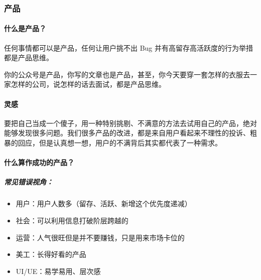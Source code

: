 \documentclass[letterpaper,11pt,english]{sphinxmanual}
\begin{document}
\subsubsection{产品}
\label{\detokenize{chapter_introduction/Product:id1}}\label{\detokenize{chapter_introduction/Product::doc}}

\paragraph{什么是产品？}
\label{\detokenize{chapter_introduction/Product:id2}}
任何事情都可以是产品，任何让用户挑不出 Bug
并有高留存高活跃度的行为举措都是产品思维。

你的公众号是产品，你写的文章也是产品，甚至，你今天要穿一套怎样的衣服去一家怎样的公司，说怎样的话去面试，都是产品思维。


\paragraph{灵感}
\label{\detokenize{chapter_introduction/Product:id3}}
要把自己当成一个傻子，用一种特别挑剔、不满意的方法去试用自己的产品，绝对能够发现很多问题。我们很多产品的改进，都是来自用户看起来不理性的投诉、粗暴的回应，但是认真想一想，用户的不满背后其实都代表了一种需求。
%
\begin{footnote}[16]\sphinxAtStartFootnote
{}
%
\end{footnote}


\paragraph{什么算作成功的产品？}
\label{\detokenize{chapter_introduction/Product:id4}}

\subparagraph{常见错误视角：}
\label{\detokenize{chapter_introduction/Product:id5}}\begin{itemize}
\item {} 
用户：用户人数多（留存、活跃、新增这个优先度递减）

\item {} 
社会：可以利用信息打破阶层跨越的

\item {} 
运营：人气很旺但是并不要赚钱，只是用来市场卡位的

\item {} 
美工：长得好看的产品

\item {} 
UI/UE：易学易用、层次感

\end{itemize}
\end{document}

